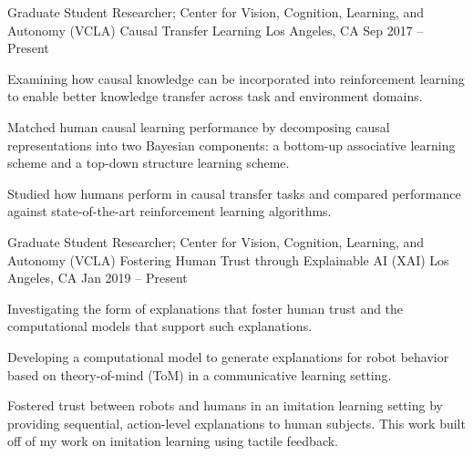 


\begin{cventries}



\cventry
{Graduate Student Researcher; Center for Vision, Cognition, Learning, and Autonomy (VCLA)}
{Causal Transfer Learning}
{Los Angeles, CA}
{Sep 2017 – Present}
{
\begin{cvitems}
\item Examining how causal knowledge can be incorporated into reinforcement learning to enable better knowledge transfer across task and environment domains.
\item Matched human causal learning performance by decomposing causal representations into two Bayesian components: a bottom-up associative learning scheme and a top-down structure learning scheme.
\item Studied how humans perform in causal transfer tasks and compared performance against state-of-the-art reinforcement learning algorithms.
\end{cvitems}
}


\cventry
{Graduate Student Researcher; Center for Vision, Cognition, Learning, and Autonomy (VCLA)}
{Fostering Human Trust through Explainable AI (XAI)}
{Los Angeles, CA}
{Jan 2019 – Present}
{
\begin{cvitems}
\item Investigating the form of explanations that foster human trust and the computational models that support such explanations.
\item Developing a computational model to generate explanations for robot behavior based on theory-of-mind (ToM) in a communicative learning setting.
\item Fostered trust between robots and humans in an imitation learning setting by providing sequential, action-level explanations to human subjects. This work built off of my work on imitation learning using tactile feedback.
\end{cvitems}
}


\end{cventries}
